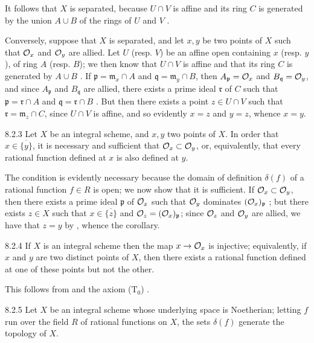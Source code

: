 \documentclass[../main.tex]{subfiles}
\begin{document}
It follows that $X$ is separated, because $U\cap V$ is affine and its ring $C$ is generated by the union $A\cup B$ of the rings of $U$ and $V$ .

Conversely, suppose that $X$ is separated, and let $x,y$ be two points of $X$ such that $\mathcal{O}_x$ and $\mathcal{O}_y$ are allied.
Let $U$ (resp. $V$) be an affine open containing $x$ (resp. $y$), of ring $A$ (resp. $B$); we then know that $U\cap V$ is affine and that its ring $C$ is generated by $A\cup B$ .
If $\mathfrak{p}=\mathfrak{m}_x\cap A$ and $\mathfrak{q}=\mathfrak{m}_y\cap B$, then $A_\mathfrak{p}=\mathcal{O}_x$ and $B_\mathfrak{q}=\mathcal{O}_y$, and since $A_\mathfrak{p}$ and $B_\mathfrak{q}$ are allied, there exists a prime ideal $\mathfrak{r}$ of $C$ such that $\mathfrak{p}=\mathfrak{r}\cap A$ and $\mathfrak{q}=\mathfrak{r}\cap B$ .
But then there exists a point $z\in U\cap V$ such that $\mathfrak{r}=\mathfrak{m}_z\cap C$, since $U\cap V$ is affine, and so evidently $x=z$ and $y=z$, whence $x=y$.

\begin{env}[Corollary]{8.2.3}
    Let $X$ be an integral scheme, and $x,y$ two points of $X$.
    In order that $x\in\overline{\{y\}}$, it is necessary and sufficient that $\mathcal{O}_x\subset\mathcal{O}_y$, or, equivalently, that every rational function defined at $x$ is also defined at $y$.
\end{env}    

The condition is evidently necessary because the domain of definition $\delta(f)$ of a rational function $f\in R$ is open; we now show that it is sufficient.
If $\mathcal{O}_x\subset\mathcal{O}_y$, then there exists a prime ideal $\mathfrak{p}$ of $\mathcal{O}_x$ such that $\mathcal{O}_y$ dominates $(\mathcal{O}_x)_\mathfrak{p}$ ; but  there exists $z\in X$ such that $x\in\overline{\{z\}}$ and $\mathcal{O}_z=(\mathcal{O}_x)_\mathfrak{p}$; since $\mathcal{O}_z$ and $\mathcal{O}_y$ are allied, we have that $z=y$ by , whence the corollary.

\begin{env}[Corollary]{8.2.4}
    If $X$ is an integral scheme then the map $x\to\mathcal{O}_x$ is injective; equivalently, if $x$ and $y$ are two distinct points of $X$, then there exists a rational function defined at one of these points but not the other.
\end{env}

This follows from  and the axiom ($\mathrm{T}_0$) .

\begin{env}[Corollary]{8.2.5}
    Let $X$ be an integral scheme whose underlying space is Noetherian; letting $f$ run over the field $R$ of rational functions on $X$, the sets $\delta(f)$ generate the topology of $X$.
\end{env}
\end{document}
